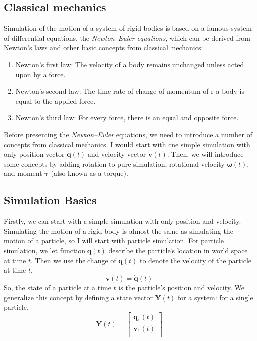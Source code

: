 \subsection{Classical mechanics}
Simulation of the motion of a system of rigid bodies is based on a famous system of differential equations, the \textit{Newton–Euler equations}, which can be derived from Newton’s laws and other basic concepts from classical mechanics:

\begin{enumerate}
    \item Newton’s first law: The velocity of a body remains unchanged unless acted upon by a force.
    \item Newton’s second law: The time rate of change of momentum of r a body is equal to the applied force.
    \item Newton’s third law: For every force, there is an equal and opposite force.
\end{enumerate}

Before presenting the \textit{Newton–Euler} equations, we need to introduce a number of concepts from classical mechanics. I would start with one simple simulation with only position vector $\pmb{q}(t)$ and velocity vector $\pmb{v}(t)$. Then, we will introduce some concepts by adding rotation to pure simulation, rotational velocity $\pmb{\omega}(t)$, and moment $\pmb{\tau}$ (also known as a torque).


\subsection{Simulation Basics}

Firstly, we can start with a simple simulation with only position and velocity. Simulating the motion of a rigid body is almost the same as simulating the motion of a particle, so I will start with particle simulation. For particle simulation, we let function $\pmb{q}(t)$ describe the particle's location in world space at time $t$. Then we use the change of $\pmb{q}(t)$
to denote the velocity of the particle at time $t$. 
\begin{equation}
    \pmb{v}(t) = \dot{\pmb{q}}(t)
\end{equation}
So, the state of a particle at a time $t$ is the particle's position and velocity. We generalize this concept by defining a state vector $\textbf{Y}(t)$ for a system: for a single particle,
\begin{equation}
    \textbf{Y}(t) = \left[
        \begin{array}{c}
            \pmb{q}_{1}(t) \\
            \pmb{v}_{1}(t) \\
        \end{array}
    \right]
\end{equation}

